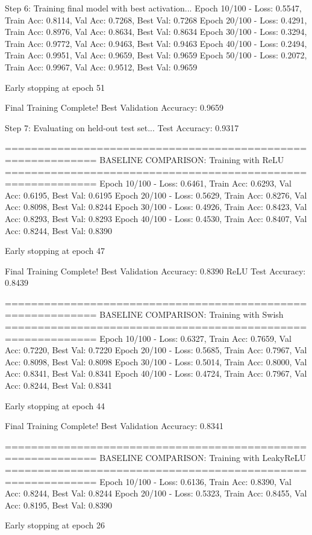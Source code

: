 Step 6: Training final model with best activation...
Epoch  10/100 - Loss: 0.5547, Train Acc: 0.8114, Val Acc: 0.7268, Best Val: 0.7268
Epoch  20/100 - Loss: 0.4291, Train Acc: 0.8976, Val Acc: 0.8634, Best Val: 0.8634
Epoch  30/100 - Loss: 0.3294, Train Acc: 0.9772, Val Acc: 0.9463, Best Val: 0.9463
Epoch  40/100 - Loss: 0.2494, Train Acc: 0.9951, Val Acc: 0.9659, Best Val: 0.9659
Epoch  50/100 - Loss: 0.2072, Train Acc: 0.9967, Val Acc: 0.9512, Best Val: 0.9659

Early stopping at epoch 51

Final Training Complete!
Best Validation Accuracy: 0.9659

Step 7: Evaluating on held-out test set...
Test Accuracy: 0.9317

============================================================
BASELINE COMPARISON: Training with ReLU
============================================================
Epoch  10/100 - Loss: 0.6461, Train Acc: 0.6293, Val Acc: 0.6195, Best Val: 0.6195
Epoch  20/100 - Loss: 0.5629, Train Acc: 0.8276, Val Acc: 0.8098, Best Val: 0.8244
Epoch  30/100 - Loss: 0.4926, Train Acc: 0.8423, Val Acc: 0.8293, Best Val: 0.8293
Epoch  40/100 - Loss: 0.4530, Train Acc: 0.8407, Val Acc: 0.8244, Best Val: 0.8390

Early stopping at epoch 47

Final Training Complete!
Best Validation Accuracy: 0.8390
ReLU Test Accuracy: 0.8439

============================================================
BASELINE COMPARISON: Training with Swish
============================================================
Epoch  10/100 - Loss: 0.6327, Train Acc: 0.7659, Val Acc: 0.7220, Best Val: 0.7220
Epoch  20/100 - Loss: 0.5685, Train Acc: 0.7967, Val Acc: 0.8098, Best Val: 0.8098
Epoch  30/100 - Loss: 0.5014, Train Acc: 0.8000, Val Acc: 0.8341, Best Val: 0.8341
Epoch  40/100 - Loss: 0.4724, Train Acc: 0.7967, Val Acc: 0.8244, Best Val: 0.8341

Early stopping at epoch 44

Final Training Complete!
Best Validation Accuracy: 0.8341

============================================================
BASELINE COMPARISON: Training with LeakyReLU
============================================================
Epoch  10/100 - Loss: 0.6136, Train Acc: 0.8390, Val Acc: 0.8244, Best Val: 0.8244
Epoch  20/100 - Loss: 0.5323, Train Acc: 0.8455, Val Acc: 0.8195, Best Val: 0.8390

Early stopping at epoch 26

